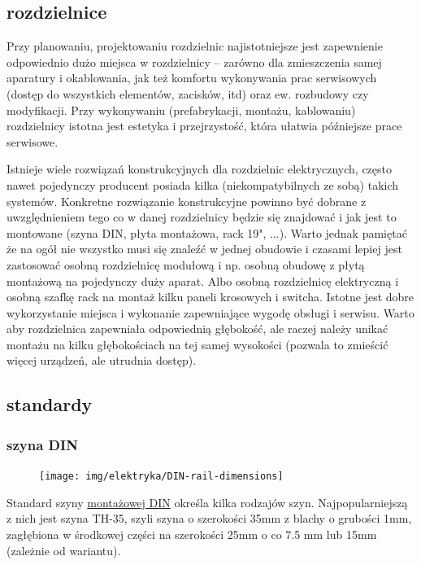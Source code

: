 \subsection{rozdzielnice}

Przy planowaniu, projektowaniu rozdzielnic najistotniejsze jest zapewnienie odpowiednio dużo miejsca w rozdzielnicy – zarówno dla zmieszczenia samej aparatury i okablowania, jak też komfortu wykonywania prac serwisowych (dostęp do wszystkich elementów, zacisków, itd) oraz ew. rozbudowy czy modyfikacji. Przy wykonywaniu (prefabrykacji, montażu, kablowaniu) rozdzielnicy istotna jest estetyka i przejrzystość, która ułatwia późniejsze prace serwisowe.

Istnieje wiele rozwiązań konstrukcyjnych dla rozdzielnic elektrycznych, często nawet pojedynczy producent posiada kilka (niekompatybilnych ze sobą) takich systemów.
Konkretne rozwiązanie konstrukcyjne powinno być dobrane z uwzględnieniem tego co w danej rozdzielnicy będzie się znajdować i jak jest to montowane (szyna DIN, płyta montażowa, rack 19", ...).
Warto jednak pamiętać że na ogół nie wszystko musi się znaleźć w jednej obudowie i czasami lepiej jest zastosować osobną rozdzielnicę modułową i np. osobną obudowę z płytą montażową na pojedynczy duży aparat.
Albo osobną rozdzielnicę elektryczną i osobną szafkę rack na montaż kilku paneli krosowych i switcha.
Istotne jest dobre wykorzystanie miejsca i wykonanie zapewniające wygodę obsługi i serwisu.
Warto aby rozdzielnica zapewniała odpowiednią głębokość, ale raczej należy unikać montażu na kilku głębokościach na tej samej wysokości (pozwala to zmieścić więcej urządzeń, ale utrudnia dostęp).

\subsection{standardy}

\subsubsection{szyna DIN}

\begin{figure} %
\vspace{-0.8cm}\texttt{[image: img/elektryka/DIN-rail-dimensions]}\vspace{-0.5cm} %
\end{figure}

Standard szyny \href{https://en.wikipedia.org/wiki/DIN_rail}{montażowej DIN} określa kilka rodzajów szyn.
Najpopularniejszą z nich jest szyna TH-35, szyli szyna o szerokości 35mm z blachy o grubości 1mm, zagłębiona w środkowej części na szerokości 25mm o co 7.5 mm lub 15mm (zależnie od wariantu).

